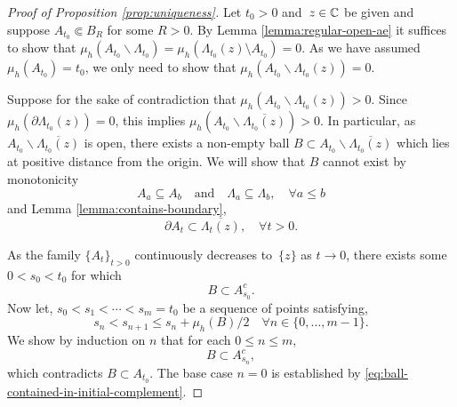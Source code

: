 \documentclass[12pt]{amsart}
\numberwithin{equation}{section}
\newcommand{\regcluster}[2]{\hyperref[eq:regular-cluster]{\Lambda^{#1}_{#2}}}
\begin{document}
	\begin{proof}[Proof of Proposition \ref{prop:uniqueness}]
		Let $t_0 > 0$ and~$z \in \mathbb{C}$ be given and suppose $A_{t_0} \Subset B_R$ for some $R > 0$. 
		By Lemma \ref{lemma:regular-open-ae} it suffices to show that $\mu_h(A_{t_0} \backslash \regcluster{}{t_0})  = \mu_h( \regcluster{}{t_0}(z) \setminus A_{t_0}) = 0$. As we have assumed $\mu_h(A_{t_0}) = t_0$, we only need to show that $\mu_h(A_{t_0} \backslash \regcluster{}{t_0}(z)) = 0$. 
		
		Suppose for the sake of contradiction that $\mu_h(A_{t_0} \backslash \regcluster{}{t_0}(z)) > 0$. 
		Since $\mu_h(\partial \regcluster{}{t_0}(z)) = 0$, this implies $\mu_h(A_{t_0} \backslash \overline{\regcluster{}{t_0}(z)})  >0$.
		In particular, as $A_{t_0} \backslash \overline{\regcluster{}{t_0}(z)}$ is open, there exists a non-empty ball $B \subset A_{t_0} \backslash \overline{\regcluster{}{t_0}(z)}$
		which lies at positive distance from the origin. We will show that $B$ cannot exist by monotonicity 
		\begin{equation} \label{eq:cluster-monotonicity}
		A_a \subseteq  A_b  \quad \text{and} \quad \regcluster{}{a} \subseteq \regcluster{}{b} , \quad \forall a \leq b 
		\end{equation}
		and Lemma \ref{lemma:contains-boundary},
		\begin{equation} \label{eq:boundary-contained}
		\partial A_{t} \subset \overline{{\regcluster{}{t}(z)}}, \quad \forall t > 0.
		\end{equation}
		
		
		As the family $\{A_t\}_{t > 0}$ continuously decreases to~$\{z\}$ as $t \to 0$, 
		there exists some $0 < s_0 < t_0$ for which 
		\begin{equation} \label{eq:ball-contained-in-initial-complement}
		B \subset A_{s_0}^c.
		\end{equation}
		Now let, $s_0 < s_1 < \cdots < s_m = t_0$ be a sequence of points satisfying, 
		\begin{equation}
		s_{n} < s_{n+1} \leq s_n + \mu_h(B)/2  \quad \forall n \in \{0,\dots,m-1\}.
		\end{equation}
		We show by induction on $n$ that for each $0 \leq n \leq m$, 
		\begin{equation} \label{eq:b-contained-in-next-cluster}
		B \subset A_{s_n}^c,
		\end{equation}
		which contradicts $B \subset A_{t_0}$. The base case $n = 0$ is established by \eqref{eq:ball-contained-in-initial-complement}. 
		

\end{proof}
\end{document}
